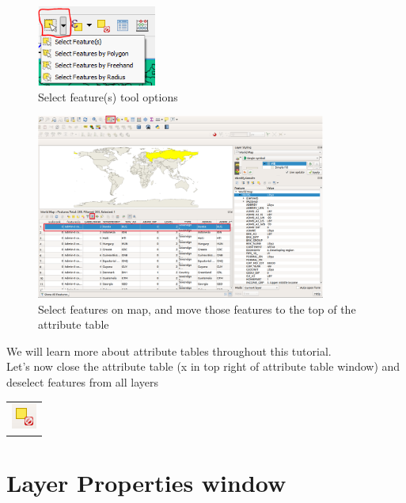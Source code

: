 \begin{figure}[!h]
	\centering
	\includegraphics[width=0.35\textwidth]{images/select_features_by_polygon_dropdown.png}
	\caption{Select feature(s) tool options}
	\label{ft_fig_firstfig3}
\end{figure}

\begin{figure}[!h]
	\centering
	\includegraphics[width=0.85\textwidth]{images/world_select_features_to_top.png}
	\caption{Select features on map, and move those features to the top of the attribute table}
	\label{ft_fig_firstfig3}
\end{figure}

We will learn more about attribute tables throughout this tutorial.\\

Let's now close the attribute table (x in top right of attribute table window) and deselect features from all layers
\begin{tabular}{@{}c@{}}\includegraphics[width=4ex]{images/deselect_features_icon.png}\end{tabular}
\null\newpage

\section{Layer Properties window}

